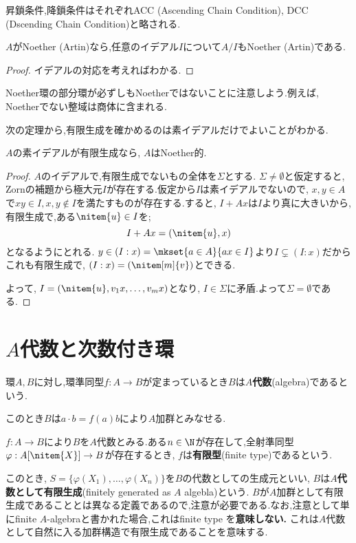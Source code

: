 昇鎖条件,降鎖条件はそれぞれACC (Ascending Chain Condition), DCC (Dscending Chain Condition)と略される.

\begin{prop}
	$A$がNoether (Artin)なら,任意のイデアル$I$について$A/I$もNoether (Artin)である.
\end{prop}
\begin{proof}
	イデアルの対応を考えればわかる.
\end{proof}

Noether環の部分環が必ずしもNoetherではないことに注意しよう.例えば, Noetherでない整域は商体に含まれる.

次の定理から,有限生成を確かめるのは素イデアルだけでよいことがわかる.
\begin{thm}[I.S.Cohen]
	$A$の素イデアルが有限生成なら, $A$はNoether的.
\end{thm}
\begin{proof}
	$A$のイデアルで,有限生成でないもの全体を$\Sigma$とする. $\Sigma\neq\emptyset$と仮定すると, Zornの補題から極大元$I$が存在する.仮定から$I$は素イデアルでないので, $x,y\in A$で$xy\in I,x,y\not\in I$を満たすものが存在する.すると, $I+Ax$は$I$より真に大きいから,有限生成で,ある$\nitem{u}\in I$を;
	\[I+Ax=(\nitem{u},x)\]
	となるようにとれる. $y\in (I:x)=\mkset{a\in A}{ax\in I}$より$I\subsetneq(I:x)$だからこれも有限生成で, $(I:x)=(\nitem[m]{v})$とできる.
	
	よって, $I=(\nitem{u},v_1x,\dots,v_mx)$となり, $I\in\Sigma$に矛盾.よって$\Sigma=\emptyset$である.
\end{proof}

\section{$A$代数と次数付き環}
\begin{defi}[$A$代数]
	環$A,B$に対し,環準同型$f:A\to B$が定まっているとき$B$は$A$\textbf{代数}(algebra)であるという.
\end{defi}

このとき$B$は$a\cdot b=f(a)b$により$A$加群とみなせる.

\begin{defi}[有限型]
	$f:A\to B$により$B$を$A$代数とみる.ある$n\in\N$が存在して,全射準同型$\varphi:A[\nitem{X}]\to B$が存在するとき, $f$は\textbf{有限型}(finite type)であるという.
\end{defi}

このとき, $S=\{\varphi(X_1),\dots,\varphi(X_n)\}$を$B$の代数としての生成元といい, $B$は$A$\textbf{代数として有限生成}(finitely generated as $A$ algebla)という. $B$が$A$加群として有限生成であることとは異なる定義であるので,注意が必要である.なお,注意として単にfinite $A$-algebraと書かれた場合,これはfinite type を\textbf{意味しない.} これは$A$代数として自然に入る加群構造で有限生成であることを意味する.

